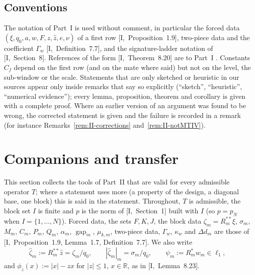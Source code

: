 \documentclass[10pt]{amsart}
\theoremstyle{definition}
\theoremstyle{remark}
\newcommand{\R}{\mathbb R}
\newcommand{\gap}{\operatorname{gap}}
\newcommand{\zh}{\hat z}
\begin{document}
\subsection{Conventions}
The notation of Part~I is used without comment, in particular the forced
data $(\xi,q_0,a,w,F,z,\zh,e,\nu)$ of a first row [I,~Proposition~1.9],
two-piece data and the coefficient $\Gamma_w$ [I,~Definition~7.7], and the
signature-ladder notation of [I,~Section~8].  References of the form
[I,~Theorem~8.20] are to Part~I \cite{PartI}.  Constants $C_f$ depend on the
first row (and on the mate where said) but not on the level, the
sub-window or the scale.  Statements that are only sketched or heuristic
in our sources appear only inside remarks that say so explicitly
(``sketch'', ``heuristic'', ``numerical evidence''); every lemma,
proposition, theorem and corollary is given with a complete proof.  Where an earlier
version of an argument was found to be wrong, the corrected statement is
given and the failure is recorded in a remark (for instance
Remarks~\ref{rem:II-corrections} and~\ref{rem:II-notMTIV}).



\section{Companions and transfer}\label{sec:II-companions}

This section collects the tools of Part~II that are valid for every
admissible operator $T$; where a statement uses more (a property of the
design, a diagonal base, one block) this is said in the statement.
Throughout, $T$ is admissible, the block set $I$ is finite and $p$ is the
norm of [I,~Section~1] built with $I$ (so $p=p_N$ when $I=\{1,\dots,N\}$).
Forced data, the sets $F,K,J$, the block data $\zeta_m=R_m^{**}\xi$,
$\sigma_m$, $M_m$, $C_m$, $P_m$, $Q_m$, $\alpha_m$, $\gap_m$, $\mu_{k,m}$,
two-piece data, $\Gamma_w$, $\kappa_w$ and $\Delta d_m$ are those of
[I,~Proposition~1.9, Lemma~1.7, Definition~7.7].  We also write
\[
 \hat\zeta_m:=R_m^{**}\zh=\zeta_m/q_0,\qquad |\hat\zeta_m|_m=\sigma_m/q_0,
 \qquad \psi_m:=R_m^*w_m\in\ell_1 ,
\]
and $\phi_z(x):=|x|-zx$ for $|z|\le1$, $x\in\R$, as in [I,~Lemma~8.23].
\end{document}
